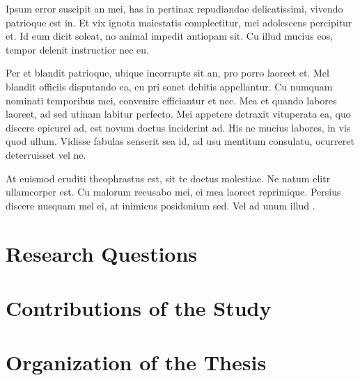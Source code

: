 Ipsum error suscipit an mei, has in pertinax repudiandae delicatissimi, vivendo patrioque est in. Et vix ignota maiestatis complectitur, mei adolescens percipitur et. Id eum dicit soleat, no animal impedit antiopam sit. Cu illud mucius eos, tempor delenit instructior nec eu.

Per et blandit patrioque, ubique incorrupte sit an, pro porro laoreet et. Mel blandit officiis disputando ea, eu pri sonet debitis appellantur. Cu numquam nominati temporibus mei, convenire efficiantur et nec. Mea et quando labores laoreet, ad sed utinam labitur perfecto. Mei appetere detraxit vituperata ea, quo discere epicurei ad, est novum doctus inciderint ad. His ne mucius labores, in vis quod ullum. Vidisse fabulas senserit sea id, ad usu mentitum consulatu, ocurreret deterruisset vel ne.

At euismod eruditi theophrastus est, sit te doctus molestiae. Ne natum elitr ullamcorper est. Cu malorum recusabo mei, ei mea laoreet reprimique. Persius discere nusquam mel ei, at inimicus posidonium sed. Vel ad unum illud \cite{Cohen1992}.

\section{Research Questions}

\section{Contributions of the Study}

\section{Organization of the Thesis}

